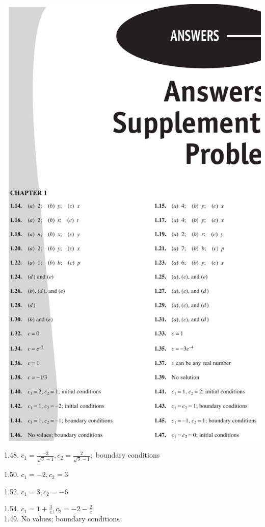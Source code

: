\documentclass[10pt]{article}
\begin{document}
\begin{center}
\includegraphics[max width=\textwidth]{2024_04_03_5bb5b4275a64cb9887d1g-356}
\end{center}

1.48. $c_{1}=\frac{-2}{\sqrt{3}-1}, c_{2}=\frac{2}{\sqrt{3}-1} ;$ boundary conditions

1.50. $c_{1}=-2, c_{2}=3$

1.52. $c_{1}=3, c_{2}=-6$

1.54. $c_{1}=1+\frac{3}{e}, c_{2}=-2-\frac{2}{e}$\\
1.49. No values; boundary conditions
\end{document}
